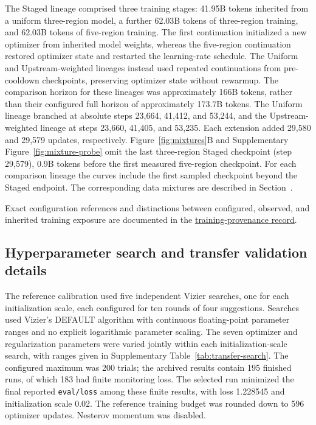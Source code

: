 \documentclass[a4paper,num-refs]{oup-contemporary}
\begin{document}
The Staged lineage comprised three training stages: 41.95B tokens
inherited from a uniform three-region model, a further 62.03B tokens
of three-region training, and 62.03B tokens of five-region training.
The first continuation initialized a new optimizer from inherited
model weights, whereas the five-region continuation restored
optimizer state and restarted the learning-rate schedule.
The Uniform and Upstream-weighted lineages instead used repeated continuations
from pre-cooldown checkpoints, preserving optimizer state without
rewarmup.
The comparison horizon for these lineages was approximately
166B tokens, rather than their configured full horizon of
approximately 173.7B tokens.
The Uniform lineage branched at absolute steps 23,664, 41,412, and 53,244,
and the Upstream-weighted lineage at steps 23,660, 41,405, and 53,235.
Each extension added 29,580 and 29,579 updates, respectively.
Figure~\ref{fig:mixtures}B and Supplementary Figure~\ref{fig:mixture-probe}
omit the last three-region Staged checkpoint (step 29,579), 0.9B tokens
before the first measured five-region checkpoint. For each comparison
lineage the curves include the first sampled checkpoint beyond the
Staged endpoint. The corresponding data mixtures are described in
Section~.

Exact configuration references and distinctions between configured,
observed, and inherited training exposure are documented in the
\href{https://github.com/Open-Athena/marin-dna-paper/blob/main/data/training_provenance/sources.json}{training-provenance record}.


\subsection{Hyperparameter search and transfer validation details}
\label{supp:transfer-details}

The reference calibration used five independent Vizier searches,
one for each initialization scale, each configured for ten rounds
of four suggestions.
Searches used Vizier's DEFAULT algorithm with continuous
floating-point parameter ranges and no explicit logarithmic
parameter scaling.
The seven optimizer and regularization parameters were varied
jointly within each initialization-scale search, with ranges
given in Supplementary Table~\ref{tab:transfer-search}.
The configured maximum was 200 trials; the archived results
contain 195 finished runs, of which 183 had finite monitoring loss.
The selected run minimized the final reported \texttt{eval/loss}
among these finite results, with loss 1.228545 and initialization
scale 0.02.
The reference training budget was rounded down to 596 optimizer
updates. Nesterov momentum was disabled.
\end{document}
